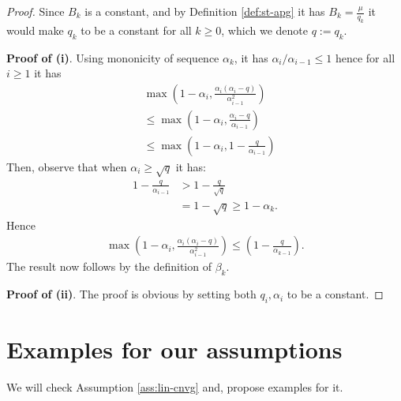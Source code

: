 \documentclass[12pt]{article}
\begin{document}
            \begin{proof}
                Since $B_k$ is a constant, and by Definition \ref{def:st-apg} it has $B_k = \frac{\mu}{q_k}$ it would make $q_k$ to be a constant for all $k \ge 0$, which we denote $q := q_k$. 
                \par
                \textbf{Proof of (i)}. 
                Using mononicity of sequence $\alpha_k$, it has $\alpha_i / \alpha_{i - 1} \le 1$ hence for all $i \ge 1$ it has 
                \begin{align*}
                    & \max\left(
                        1 - \alpha_i, 
                        \frac{\alpha_i(\alpha_i - q)}{\alpha_{i - 1}^2}
                    \right)
                    \\
                    &\le 
                    \max\left(
                        1 - \alpha_i, \frac{\alpha_i - q}{\alpha_{i - 1}}
                    \right)
                    \\
                    &\le \max\left(
                        1 - \alpha_i, 1 - \frac{q}{\alpha_{i - 1}}
                    \right)
                \end{align*}
                Then, observe that when $\alpha_i \ge \sqrt{q}$ it has: 
                \begin{align*}
                    1 - \frac{q}{\alpha_{i - 1}} &> 1 - \frac{q}{\sqrt{q}}
                    \\
                    &= 1 - \sqrt{q} \ge 1 - \alpha_k. 
                \end{align*}
                Hence
                \begin{align*}
                    \max\left(
                        1 - \alpha_i, 
                        \frac{\alpha_i(\alpha_i - q)}{\alpha_{i - 1}^2}
                    \right)\le 
                    \left(1 - \frac{q}{\alpha_{k - 1}}\right).
                \end{align*}
                The result now follows by the definition of $\beta_k$. 
                \par 
                \textbf{Proof of (ii)}. 
                The proof is obvious by setting both $q_i, \alpha_i$ to be a constant. 
            \end{proof}
        
        
\section{Examples for our assumptions}
    We will check Assumption \ref{ass:lin-cnvg} and, propose examples for it.
\end{document}
